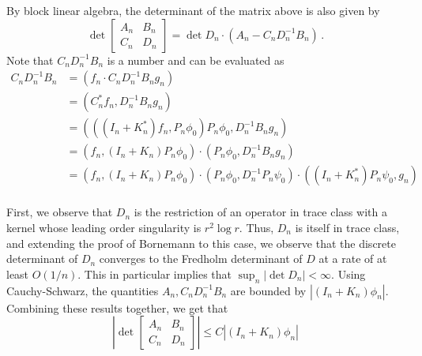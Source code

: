 By block linear algebra, the determinant of the matrix above is also given by
\begin{equation}
\det{
\begin{bmatrix}
A_{n} & B_{n} \\
C_{n} & D_{n} 
\end{bmatrix} 
}
= \det{D_{n}} \cdot (A_{n} - C_{n} D_{n}^{-1} B_{n}) \,.
\end{equation}
Note that $C_{n} D_{n}^{-1} B_{n}$ is a number and can be evaluated as 
\begin{equation}
\begin{aligned}
C_{n} D_{n}^{-1} B_{n} &= 
\left( f_{n} \cdot  C_{n} D_{n}^{-1} B_{n} g_{n} \right) \\
&= \left( C_{n}^{\ast} f_{n}, D_{n}^{-1} B_{n} g_{n} \right) \\
&= \left( \left((I_{n} + K_{n}^{\ast})f_{n}, P_{n} \phi_{0}\right) P_{n} \phi_{0}, D_{n}^{-1} B_{n} g_{n} \right) \\
&= \left(f_{n}, (I_{n} + K_{n})P_{n} \phi_{0} \right) \cdot (P_{n} \phi_{0}, D_{n}^{-1} B_{n} g_{n}) \\
&= \left(f_{n}, (I_{n} + K_{n})P_{n} \phi_{0} \right) \cdot (P_{n} \phi_{0}, D_{n}^{-1} P_{n} \psi_{0})  \cdot 
\left((I_{n} + K_{n}^{\ast})P_{n} \psi_{0}, g_{n}  \right) \\
\end{aligned}
\end{equation}

First, we observe that $D_{n}$ is the restriction of an operator in trace class
with a kernel whose leading order singularity is $r^{2} \log{r}$. 
Thus, $D_{n}$ is itself in trace class, and extending the proof of Bornemann to this case,
we observe that the discrete determinant of $D_{n}$ converges to the Fredholm determinant
of $D$ at a rate of at least $O(1/n)$. This in particular implies that
$\sup_{n} |\det{D_{n}}| <\infty$.
Using Cauchy-Schwarz, the quantities $A_{n}, C_{n}D_{n}^{-1}B_{n}$ are bounded by
$|(I_{n} + K_{n})\phi_{n}|$.
Combining these results together, we get that
\begin{equation}
\left| \det{\begin{bmatrix} A_{n} & B_{n} \\ C_{n} & D_{n} \end{bmatrix}} \right| \leq C |(I_{n} + K_{n})\phi_{n}|
\end{equation}
